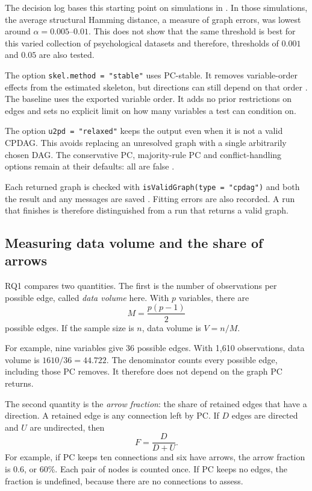 \documentclass[11pt,a4paper]{article}
\begin{document}
The decision log bases this starting point on simulations in \citet{kalisch2007}. In those simulations, the average structural Hamming distance, a measure of graph errors, was lowest around $\alpha=0.005$--$0.01$. This does not show that the same threshold is best for this varied collection of psychological datasets and therefore, thresholds of $0.001$ and $0.05$ are also tested. 

The option \texttt{skel.method = "stable"} uses PC-stable. It removes variable-order effects from the estimated skeleton, but directions can still depend on that order \citep{colombo2014}. The baseline uses the exported variable order. It adds no prior restrictions on edges and sets no explicit limit on how many variables a test can condition on.

The option \texttt{u2pd = "relaxed"} keeps the output even when it is not a valid CPDAG. This avoids replacing an unresolved graph with a single arbitrarily chosen DAG. The conservative PC, majority-rule PC and conflict-handling options remain at their defaults: all are false \citep{pcalgpc}.

Each returned graph is checked with \texttt{isValidGraph(type = "cpdag")} and both the result and any messages are saved \citep{pcalgvalid}. Fitting errors are also recorded. A run that finishes is therefore distinguished from a run that returns a valid graph.

\subsection{Measuring data volume and the share of arrows}
RQ1 compares two quantities. The first is the number of observations per possible edge, called \emph{data volume} here. With $p$ variables, there are
\begin{equation}
M=\frac{p(p-1)}{2}
\end{equation}
possible edges. If the sample size is $n$, data volume is $V=n/M$.

For example, nine variables give 36 possible edges. With 1,610 observations, data volume is $1610/36=44.722$. The denominator counts every possible edge, including those PC removes. It therefore does not depend on the graph PC returns.

The second quantity is the \emph{arrow fraction}: the share of retained edges that have a direction. A retained edge is any connection left by PC. If $D$ edges are directed and $U$ are undirected, then
\begin{equation}
F=\frac{D}{D+U}.
\end{equation}
For example, if PC keeps ten connections and six have arrows, the arrow fraction is $0.6$, or 60\%. Each pair of nodes is counted once. If PC keeps no edges, the fraction is undefined, because there are no connections to assess.
\end{document}
